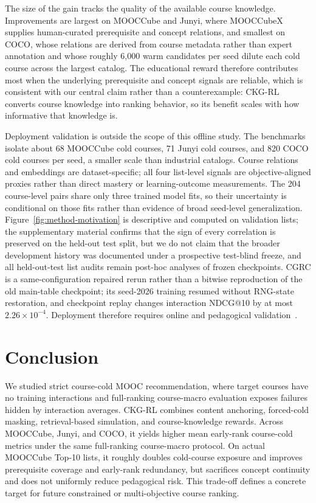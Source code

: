 \documentclass[letterpaper]{article}
\begin{document}
The size of the gain tracks the quality of the available course knowledge. Improvements are largest on MOOCCube and Junyi, where MOOCCubeX supplies human-curated prerequisite and concept relations, and smallest on COCO, whose relations are derived from course metadata rather than expert annotation and whose roughly 6{,}000 warm candidates per seed dilute each cold course across the largest catalog. The educational reward therefore contributes most when the underlying prerequisite and concept signals are reliable, which is consistent with our central claim rather than a counterexample: CKG-RL converts course knowledge into ranking behavior, so its benefit scales with how informative that knowledge is.

Deployment validation is outside the scope of this offline study. The benchmarks isolate about 68 MOOCCube cold courses, 71 Junyi cold courses, and 820 COCO cold courses per seed, a smaller scale than industrial catalogs. Course relations and embeddings are dataset-specific; all four list-level signals are objective-aligned proxies rather than direct mastery or learning-outcome measurements. The 204 course-level pairs share only three trained model fits, so their uncertainty is conditional on those fits rather than evidence of broad seed-level generalization. Figure~\ref{fig:method-motivation} is descriptive and computed on validation lists; the supplementary material confirms that the sign of every correlation is preserved on the held-out test split, but we do not claim that the broader development history was documented under a prospective test-blind freeze, and all held-out-test list audits remain post-hoc analyses of frozen checkpoints. CGRC is a same-configuration repaired rerun rather than a bitwise reproduction of the old main-table checkpoint; its seed-2026 training resumed without RNG-state restoration, and checkpoint replay changes interaction NDCG@10 by at most $2.26\times10^{-4}$. Deployment therefore requires online and pedagogical validation~\cite{dasilva2023educationalrs,stray2024values}.

\section{Conclusion}
We studied strict course-cold MOOC recommendation, where target courses have no training interactions and full-ranking course-macro evaluation exposes failures hidden by interaction averages. CKG-RL combines content anchoring, forced-cold masking, retrieval-based simulation, and course-knowledge rewards. Across MOOCCube, Junyi, and COCO, it yields higher mean early-rank course-cold metrics under the same full-ranking course-macro protocol. On actual MOOCCube Top-10 lists, it roughly doubles cold-course exposure and improves prerequisite coverage and early-rank redundancy, but sacrifices concept continuity and does not uniformly reduce pedagogical risk. This trade-off defines a concrete target for future constrained or multi-objective course ranking.
\end{document}
